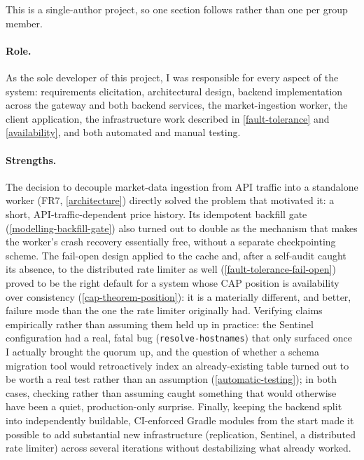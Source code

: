 \documentclass{scrartcl}
\begin{document}
This is a single-author project, so one section follows rather than one per group member.

\paragraph{Role.} As the sole developer of this project, I was responsible for every aspect of
the system: requirements elicitation, architectural design, backend implementation across the
gateway and both backend services, the market-ingestion worker, the client application, the
infrastructure work described in \cref{fault-tolerance} and \cref{availability}, and both
automated and manual testing.

\paragraph{Strengths.} The decision to decouple market-data ingestion from API traffic into a
standalone worker (FR7, \cref{architecture}) directly solved the problem that motivated it: a
short, API-traffic-dependent price history. Its idempotent backfill gate
(\cref{modelling-backfill-gate}) also turned out to double as the mechanism that makes the
worker's crash recovery essentially free, without a separate checkpointing scheme. The fail-open
design applied to the cache and, after a self-audit caught its absence, to the distributed rate
limiter as well (\cref{fault-tolerance-fail-open}) proved to be the right default for a system
whose CAP position is availability over consistency (\cref{cap-theorem-position}): it is a
materially different, and better, failure mode than the one the rate limiter originally had.
Verifying claims empirically rather than assuming them held up in practice: the Sentinel
configuration had a real, fatal bug (\texttt{resolve-hostnames}) that only surfaced once I
actually brought the quorum up, and the question of whether a schema migration tool would
retroactively index an already-existing table turned out to be worth a real test rather than an
assumption (\cref{automatic-testing}); in both cases, checking rather than assuming caught
something that would otherwise have been a quiet, production-only surprise. Finally, keeping the
backend split into independently buildable, CI-enforced Gradle modules from the start made it
possible to add substantial new infrastructure (replication, Sentinel, a distributed rate
limiter) across several iterations without destabilizing what already worked.
\end{document}
